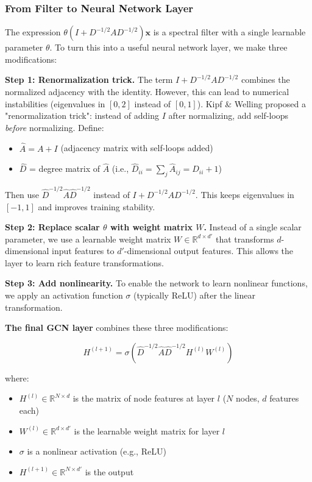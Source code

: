 \begin{notechapter}
\subsubsection{From Filter to Neural Network Layer}

The expression $\theta(I + D^{-1/2} A D^{-1/2})\mathbf{x}$ is a spectral 
filter with a single learnable parameter $\theta$. To turn this into a 
useful neural network layer, we make three modifications:

\textbf{Step 1: Renormalization trick.} The term $I + D^{-1/2} A D^{-1/2}$ 
combines the normalized adjacency with the identity. However, this can 
lead to numerical instabilities (eigenvalues in $[0, 2]$ instead of 
$[0, 1]$). Kipf \& Welling \cite{dft-to-gnn:kipf2017semi} proposed a "renormalization trick": instead 
of adding $I$ after normalizing, add self-loops \emph{before} normalizing. 
Define:
\begin{itemize}
    \item $\hat{A} = A + I$ (adjacency matrix with self-loops added)
    \item $\hat{D}$ = degree matrix of $\hat{A}$ (i.e., 
          $\hat{D}_{ii} = \sum_j \hat{A}_{ij} = D_{ii} + 1$)
\end{itemize}
Then use $\hat{D}^{-1/2} \hat{A} \hat{D}^{-1/2}$ instead of 
$I + D^{-1/2} A D^{-1/2}$. This keeps eigenvalues in $[-1, 1]$ and 
improves training stability.

\textbf{Step 2: Replace scalar $\theta$ with weight matrix $W$.} 
Instead of a single scalar parameter, we use a learnable weight matrix 
$W \in \mathbb{R}^{d \times d'}$ that transforms $d$-dimensional input 
features to $d'$-dimensional output features. This allows the layer to 
learn rich feature transformations.

\textbf{Step 3: Add nonlinearity.} To enable the network to learn 
nonlinear functions, we apply an activation function $\sigma$ (typically 
ReLU) after the linear transformation.

\textbf{The final GCN layer} combines these three modifications:

\begin{equation}
H^{(l+1)} = \sigma\left( \hat{D}^{-1/2} \hat{A} \hat{D}^{-1/2} 
             H^{(l)} W^{(l)} \right)
\end{equation}

where:
\begin{itemize}
    \item $H^{(l)} \in \mathbb{R}^{N \times d}$ is the matrix of node 
          features at layer $l$ ($N$ nodes, $d$ features each)
    \item $W^{(l)} \in \mathbb{R}^{d \times d'}$ is the learnable weight 
          matrix for layer $l$
    \item $\sigma$ is a nonlinear activation (e.g., ReLU)
    \item $H^{(l+1)} \in \mathbb{R}^{N \times d'}$ is the output
\end{itemize}


\end{notechapter}
